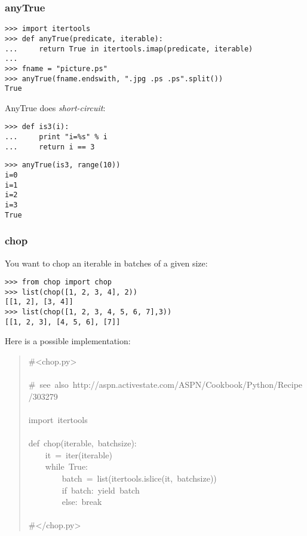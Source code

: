 \documentclass[10pt,a4paper,english]{article}
\begin{document}

\hypertarget{anytrue}{}
\subsubsection*{anyTrue}
\begin{verbatim}>>> import itertools
>>> def anyTrue(predicate, iterable): 
...     return True in itertools.imap(predicate, iterable)
...
>>> fname = "picture.ps"
>>> anyTrue(fname.endswith, ".jpg .ps .ps".split())
True\end{verbatim}

AnyTrue does \emph{short-circuit}:
\begin{verbatim}>>> def is3(i):
...     print "i=%s" % i
...     return i == 3\end{verbatim}
\begin{verbatim}>>> anyTrue(is3, range(10))
i=0
i=1
i=2
i=3
True\end{verbatim}



\hypertarget{chop}{}
\subsubsection*{chop}

You want to chop an iterable in batches of a given size:
\begin{verbatim}>>> from chop import chop
>>> list(chop([1, 2, 3, 4], 2))
[[1, 2], [3, 4]]
>>> list(chop([1, 2, 3, 4, 5, 6, 7],3))
[[1, 2, 3], [4, 5, 6], [7]]\end{verbatim}

Here is a possible implementation:
\begin{quote}{\ttfamily \raggedright \noindent
{\#}<chop.py>~\\
~\\
{\#}~see~also~http://aspn.activestate.com/ASPN/Cookbook/Python/Recipe/303279~\\
~\\
import~itertools~\\
~\\
def~chop(iterable,~batchsize):~\\
~~~~it~=~iter(iterable)~\\
~~~~while~True:~\\
~~~~~~~~batch~=~list(itertools.islice(it,~batchsize))~\\
~~~~~~~~if~batch:~yield~batch~\\
~~~~~~~~else:~break~\\
~\\
{\#}</chop.py>
}\end{quote}
\end{document}
